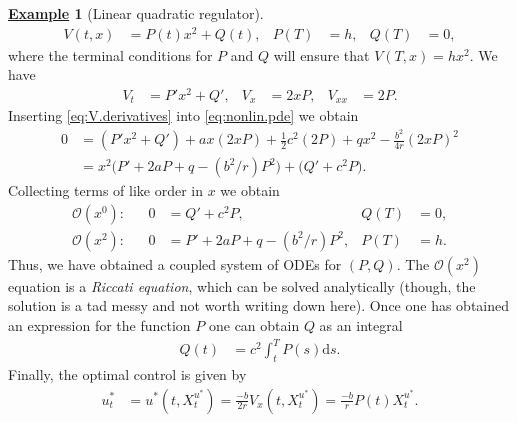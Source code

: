 \documentclass[12pt]{book}
\numberwithin{equation}{chapter}
\theoremstyle{plain}
\numberwithin{theorem}{section}
\theoremstyle{definition}
\newtheorem{example}[theorem]{\underline{Example}}
\numberwithin{exercise}{chapter}
\newcommand{\<}{\langle}
\renewcommand{\>}{\rangle}
\renewcommand{\(}{\left(}
\renewcommand{\)}{\right)}
\renewcommand{\[}{\left[}
\renewcommand{\]}{\right]}
\newcommand\Oc{\mathscr{O}}
\newcommand\dd{\mathrm{d}}
\begin{document}
\begin{example}[Linear quadratic regulator]
\begin{align}
V(t,x)
	&=	P(t) x^2 + Q(t) , &
P(T)
	&=	h , &
Q(T)
	&=	0 ,
\end{align}
where the terminal conditions for $P$ and $Q$ will ensure that $V(T,x) = h x^2$.  We have
\begin{align}
V_t
	&=	P' x^2 + Q' , &
V_x
	&=	2 x P , &
V_{xx}
	&=	2 P . \label{eq:V.derivatives}
\end{align}
Inserting \eqref{eq:V.derivatives} into \eqref{eq:nonlin.pde} we obtain
\begin{align}
0
	&=	(P' x^2 + Q') + a x ( 2 x P ) + \tfrac{1}{2} c^2 (2 P)  + q x^2 - \frac{ b^2 }{4 r } (2 x P )^2 \\
	&=	x^2 \Big( P' + 2 a P + q - (b^2/r) P^2 \Big)
			+ \Big( Q' + c^2 P \Big) .
\end{align}
Collecting terms of like order in $x$ we obtain
\begin{align}
\Oc(x^0):&&
0
	&=	Q' + c^2 P , &
Q(T)
	&=	0 , \\
\Oc(x^2):&&
0
	&=	P' + 2 a P + q - (b^2/r) P^2 , &
P(T)
	&=	h .
\end{align}
Thus, we have obtained a coupled system of ODEs for $(P,Q)$.  The $\Oc(x^2)$ equation is a \textit{Riccati equation}, which can be solved analytically (though, the solution is a tad messy and not worth writing down here).  Once one has obtained an expression for the function $P$ one can obtain $Q$ as an integral
\begin{align}
Q(t)
	&=	c^2 \int_t^T P(s) \dd s .
\end{align}
Finally, the optimal control is given by
\begin{align}
u_t^*
	&=	u^*(t,X_t^{u^*})
	=		\frac{- b }{2 r } V_x(t,X_t^{u^*})
	=		\frac{ - b }{r} P(t) X_t^{u^*} .
\end{align}
\end{example}
\end{document}
